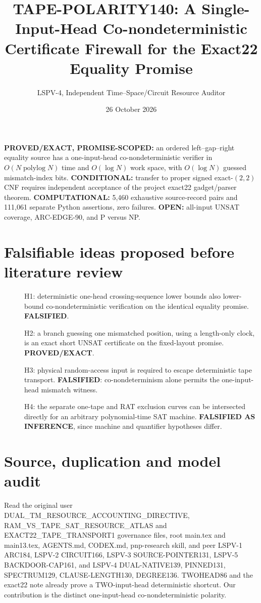 \documentclass[11pt]{article}
\title{TAPE-POLARITY140: A Single-Input-Head Co-nondeterministic Certificate Firewall for the Exact22 Equality Promise}
\author{LSPV-4, Independent Time--Space/Circuit Resource Auditor}
\date{26 October 2026}
\begin{document}
\maketitle
\noindent\textbf{PROVED/EXACT, PROMISE-SCOPED:} an ordered left--gap--right equality source has a one-input-head co-nondeterministic verifier in $O(N\operatorname{polylog}N)$ time and $O(\log N)$ work space, with $O(\log N)$ guessed mismatch-index bits. \textbf{CONDITIONAL:} transfer to proper signed exact-$(2,2)$ CNF requires independent acceptance of the project exact22 gadget/parser theorem. \textbf{COMPUTATIONAL:} 5,460 exhaustive source-record pairs and 111,061 separate Python assertions, zero failures. \textbf{OPEN:} all-input UNSAT coverage, ARC-EDGE-90, and P versus NP.

\section{Falsifiable ideas proposed before literature review}
\begin{description}
\item[] H1: deterministic one-head crossing-sequence lower bounds also lower-bound co-nondeterministic verification on the identical equality promise. \textbf{FALSIFIED}.
\item[] H2: a branch guessing one mismatched position, using a length-only clock, is an exact short UNSAT certificate on the fixed-layout promise. \textbf{PROVED/EXACT}.
\item[] H3: physical random-access input is required to escape deterministic tape transport. \textbf{FALSIFIED}: co-nondeterminism alone permits the one-input-head mismatch witness.
\item[] H4: the separate one-tape and RAT exclusion curves can be intersected directly for an arbitrary polynomial-time SAT machine. \textbf{FALSIFIED AS INFERENCE}, since machine and quantifier hypotheses differ.
\end{description}

\section{Source, duplication and model audit}
Read the original user DUAL\_TM\_RESOURCE\_ACCOUNTING\_DIRECTIVE, RAM\_VS\_TAPE\_SAT\_RESOURCE\_ATLAS and EXACT22\_TAPE\_TRANSPORT1 governance files, root main.tex and main13.tex, AGENTS.md, CODEX.md, pnp-research skill, and peer LSPV-1 ARC184, LSPV-2 CIRCUIT166, LSPV-3 SOURCE-POINTER131, LSPV-5 BACKDOOR-CAP161, and LSPV-4 DUAL-NATIVE139, PINNED131, SPECTRUM129, CLAUSE-LENGTH130, DEGREE136. TWOHEAD86 and the exact22 note already prove a TWO-input-head deterministic shortcut. Our contribution is the distinct one-input-head co-nondeterministic polarity.
\end{document}
